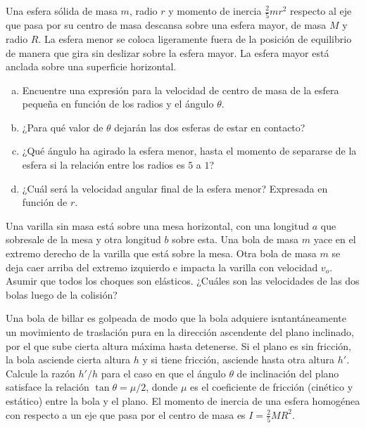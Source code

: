 \begin{ejercicio}
	Una esfera sólida de masa $m$, radio $r$ y momento de inercia $\frac{2}{5} mr^2$ respecto al eje que pasa por su centro de masa descansa sobre una esfera mayor, de masa $M$ y radio $R$. La esfera menor se coloca ligeramente fuera de la posición de equilibrio de manera que gira sin deslizar sobre la esfera mayor. La esfera mayor está anclada sobre una superficie horizontal. 
	\begin{enumerate}[a)]
		\item Encuentre una expresión para la velocidad de centro de masa de la esfera pequeña en función de los radios y el ángulo $\theta$.
		\item ¿Para qué valor de $\theta$ dejarán las dos esferas de estar en contacto?
		\item ¿Qué ángulo ha agirado la esfera menor, hasta el momento de separarse de la esfera si la relación entre los radios es $5$ a $1$?
		\item ¿Cuál será la velocidad angular final de la esfera menor? Expresada en función de $r$.
	\end{enumerate}
\end{ejercicio}



\begin{ejercicio}
	Una varilla sin masa está sobre una mesa horizontal, con una longitud $a$ que sobresale de la mesa y otra longitud $b$ sobre esta. Una bola de masa $m$ yace en el extremo derecho de la varilla que está sobre la mesa. Otra bola de masa $m$ se deja caer arriba del extremo izquierdo e impacta la varilla con velocidad $v_o$. Asumir que todos los choques son elásticos. ¿Cuáles son las velocidades de las dos bolas luego de la colisión?
\end{ejercicio}






\begin{ejercicio}
	Una bola de billar es golpeada de modo que la bola adquiere isntantáneamente un movimiento de traslación pura en la dirección ascendente del plano inclinado, por el que sube cierta altura máxima hasta detenerse. Si el plano es sin fricción, la bola asciende cierta altura $h$ y si tiene fricción, asciende hasta otra altura $h'$. \\
	
	\noindent Calcule la razón $h'/h$ para el caso en que el ángulo $\theta$ de inclinación del plano satisface la relación $\tan{\theta} = \mu /2$, donde $\mu$ es el coeficiente de fricción (cinético y estático) entre la bola y el plano. El momento de inercia de una esfera homogénea con respecto a un eje que pasa por el centro de masa es $I = \frac{2}{5} MR^2$.
\end{ejercicio}






